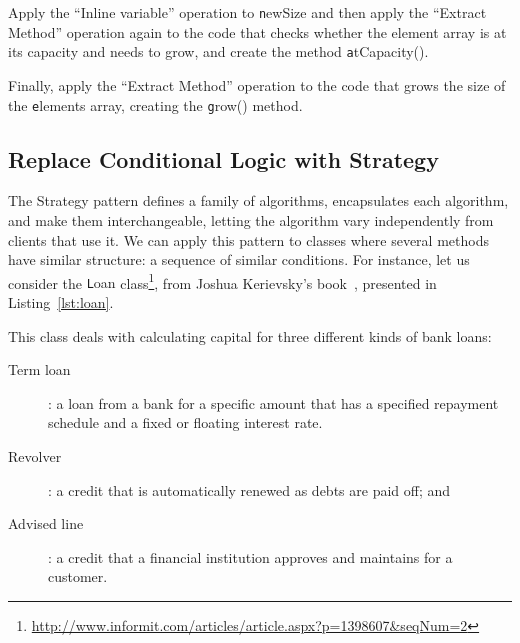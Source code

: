 \documentclass[a4paper,11pt]{memoir}
\newcommand{\code}[1]{{\texttt #1}}
\begin{document}
\begin{exercise}
	Apply the ``Inline variable'' operation to \code{newSize} and then apply the ``Extract Method'' operation again to the code that checks whether the element array is at its capacity and needs to grow, and create the method \code{atCapacity()}.
\end{exercise}

\begin{exercise}
	Finally, apply the ``Extract Method'' operation to the code that grows the size of the \code{elements} array, creating the \code{grow()} method.
\end{exercise}

\begin{solution}
	
\end{solution}

\newpage

\subsection{Replace Conditional Logic with Strategy}

The  Strategy pattern defines a family of algorithms, encapsulates each algorithm, and make them interchangeable, letting the algorithm vary independently from clients that use it.
We can apply this pattern to classes where several methods have similar structure: a sequence of similar conditions.
For instance, let us consider the \code{Loan} class\footnote{\url{http://www.informit.com/articles/article.aspx?p=1398607&seqNum=2}}, from Joshua Kerievsky's book~\cite{Kerievsky:2004}, presented in Listing~\ref{lst:loan}.

\lstset{caption=The Loan Class,label=lst:loan,float=htbp}


This class deals with calculating capital for three different kinds of bank loans: 

\begin{description}
	\item [Term loan]: a loan from a bank for a specific amount that has a specified repayment schedule and a fixed or floating interest rate. 
	\item [Revolver]: a credit that is automatically renewed as debts are paid off; and
	\item [Advised line]: a credit that a financial institution approves and maintains for a customer.
\end{description}
\end{document}
